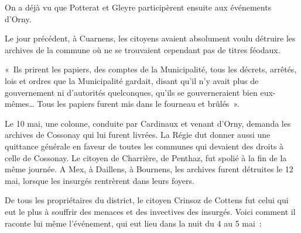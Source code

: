 \documentclass[french,twoside]{book} %
\newenvironment{quoteblock}%
  {\begin{quoting}}
  {\end{quoting}}
\newenvironment{quotebar}{%
    \def\FrameCommand{{\color{rubric!10!}\vrule width 0.5em} \hspace{0.9em}}%
    \def\OuterFrameSep{\itemsep} %
    \MakeFramed {\advance\hsize-\width \FrameRestore}
  }%
  {%
    \endMakeFramed
  }
\renewenvironment{quoteblock}%
  {%
    \savenotes
    \setstretch{0.9}
    \normalfont
    \begin{quotebar}
  }
  {%
    \end{quotebar}
    \spewnotes
  }
\begin{document}
\noindent On a déjà vu que Potterat et Gleyre participèrent ensuite aux événements d’Orny.\par
Le jour précédent, à Cuarnens, les citoyens avaient absolument voulu détruire les archives de la commune où ne se trouvaient cependant pas de titres féodaux.\par

\begin{quoteblock}
 \noindent « Ils prirent les papiers, des comptes de la Municipalité, tous les décrets, arrêtés, lois et ordres que la Municipalité gardait, disant qu’il n’y avait plus de gouvernement ni d’autorités quelconques, qu’ils se gouverneraient bien eux-mêmes… Tous les papiers furent mis dans le fourneau et brûlés ».
 \end{quoteblock}

\noindent Le 10 mai, une colonne, conduite par Cardinaux et venant d’Orny, demanda les archives de Cossonay qui lui furent livrées. La Régie dut donner aussi une quittance générale en faveur de toutes les communes qui devaient des droits à celle de Cossonay. Le citoyen de Charrière, de Penthaz, fut spolié à la fin de la même journée. A Mex, à Daillens, à Bournens, les archives furent détruites le 12 mai, lorsque les insurgés rentrèrent dans leurs foyers.\par
De tous les propriétaires du district, le citoyen Crinsoz de Cottens fut celui qui eut le plus à souffrir des menaces et des invectives des insurgés. Voici comment il raconte lui même l’événement, qui eut lieu dans la nuit du 4 au 5 mai :\par
\end{document}
